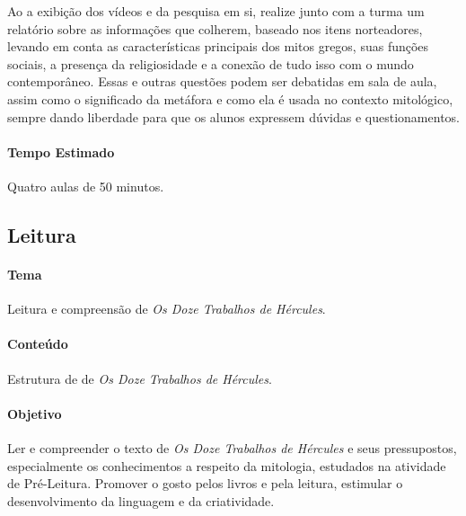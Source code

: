 \documentclass[11pt]{extarticle}
\begin{document}

Ao a exibição dos vídeos e da pesquisa em si, realize junto com a turma um relatório sobre as informações que colherem, baseado nos itens norteadores, levando em conta as características principais dos mitos gregos, suas funções sociais, a presença da religiosidade e a conexão de tudo isso com o mundo contemporâneo. Essas e outras questões podem ser debatidas em sala de aula, assim como o significado da metáfora e como ela é usada no contexto mitológico, sempre dando liberdade para que os alunos expressem dúvidas e questionamentos.


\paragraph{Tempo Estimado} Quatro aulas de 50 minutos.

\subsection{Leitura}


\paragraph{Tema} Leitura e compreensão de \textit{Os Doze Trabalhos de Hércules}.

\paragraph{Conteúdo} Estrutura de de \textit{Os Doze Trabalhos de Hércules}.  

\paragraph{Objetivo} Ler e compreender o texto de \textit{Os Doze Trabalhos de Hércules} e seus pressupostos, especialmente os conhecimentos a respeito da mitologia, estudados na atividade de Pré-Leitura. Promover o gosto pelos livros e pela leitura, estimular o desenvolvimento da linguagem e da criatividade.   
\end{document}

